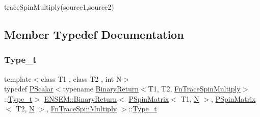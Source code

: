trace\+Spin\+Multiply(source1,source2) 

\subsection{Member Typedef Documentation}
\mbox{\label{structENSEM_1_1BinaryReturn_3_01PSpinMatrix_3_01T1_00_01N_01_4_00_01PSpinMatrix_3_01T2_00_01N_01fe1ad0c4fbb2ea3b6d703682cfed6045_a66286a845d3a1b506d5d5116c7e3e2a1}} 
\subsubsection{\texorpdfstring{Type\_t}{Type\_t}\hspace{0.1cm}{\footnotesize\ttfamily [1/3]}}
{\footnotesize\ttfamily template$<$class T1 , class T2 , int N$>$ \\
typedef \mbox{\hyperlink{classENSEM_1_1PScalar}{P\+Scalar}}$<$typename \mbox{\hyperlink{structENSEM_1_1BinaryReturn}{Binary\+Return}}$<$T1, T2, \mbox{\hyperlink{structENSEM_1_1FnTraceSpinMultiply}{Fn\+Trace\+Spin\+Multiply}}$>$\+::\mbox{\hyperlink{structENSEM_1_1BinaryReturn_3_01PSpinMatrix_3_01T1_00_01N_01_4_00_01PSpinMatrix_3_01T2_00_01N_01fe1ad0c4fbb2ea3b6d703682cfed6045_a66286a845d3a1b506d5d5116c7e3e2a1}{Type\+\_\+t}}$>$ \mbox{\hyperlink{structENSEM_1_1BinaryReturn}{E\+N\+S\+E\+M\+::\+Binary\+Return}}$<$ \mbox{\hyperlink{classENSEM_1_1PSpinMatrix}{P\+Spin\+Matrix}}$<$ T1, \mbox{\hyperlink{adat__devel_2lib_2hadron_2operator__name__util_8cc_a7722c8ecbb62d99aee7ce68b1752f337}{N}} $>$, \mbox{\hyperlink{classENSEM_1_1PSpinMatrix}{P\+Spin\+Matrix}}$<$ T2, \mbox{\hyperlink{adat__devel_2lib_2hadron_2operator__name__util_8cc_a7722c8ecbb62d99aee7ce68b1752f337}{N}} $>$, \mbox{\hyperlink{structENSEM_1_1FnTraceSpinMultiply}{Fn\+Trace\+Spin\+Multiply}} $>$\+::\mbox{\hyperlink{structENSEM_1_1BinaryReturn_3_01PSpinMatrix_3_01T1_00_01N_01_4_00_01PSpinMatrix_3_01T2_00_01N_01fe1ad0c4fbb2ea3b6d703682cfed6045_a66286a845d3a1b506d5d5116c7e3e2a1}{Type\+\_\+t}}}

